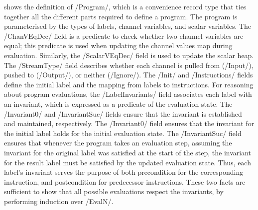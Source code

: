  shows the definition of \Hs/Program/, which is a convenience record type that ties together all the different parts required to define a program.
The program is parameterised by the types of labels, channel variables, and scalar variables.
The \Hs/ChanVEqDec/ field is a predicate to check whether two channel variables are equal; this predicate is used when updating the channel values map during evaluation.
Similarly, the \Hs/ScalarVEqDec/ field is used to update the scalar heap.
The \Hs/StreamType/ field describes whether each channel is pulled from (\Hs/Input/), pushed to (\Hs/Output/), or neither (\Hs/Ignore/).
The \Hs/Init/ and \Hs/Instructions/ fields define the initial label and the mapping from labels to instructions.
For reasoning about program evaluations, the \Hs/LabelInvariants/ field associates each label with an invariant, which is expressed as a predicate of the evaluation state.
The \Hs/Invariant0/ and \Hs/InvariantSuc/ fields ensure that the invariant is established and maintained, respectively.
The \Hs/Invariant0/ field ensures that the invariant for the initial label holds for the initial evaluation state.
The \Hs/InvariantSuc/ field ensures that whenever the program takes an evaluation step, assuming the invariant for the original label was satisfied at the start of the step, the invariant for the result label must be satisfied by the updated evaluation state.
Thus, each label's invariant serves the purpose of both precondition for the corresponding instruction, and postcondition for predecessor instructions.
These two facts are sufficient to show that all possible evaluations respect the invariants, by performing induction over \Hs/EvalN/.

